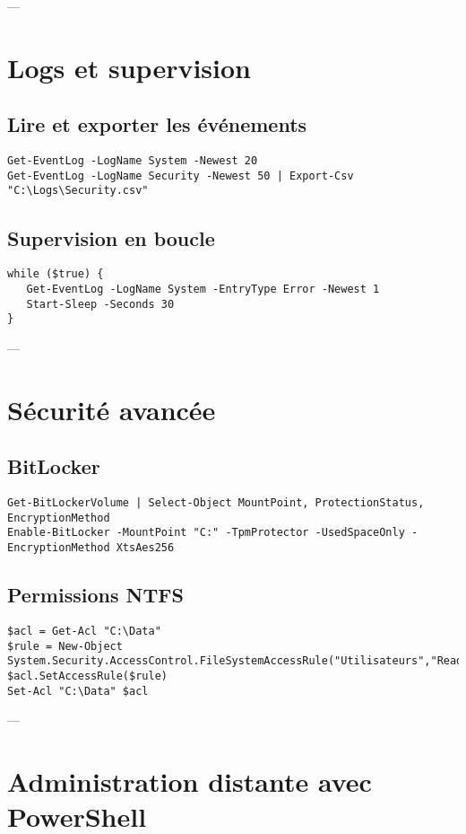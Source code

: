 \documentclass[a4paper,12pt]{article}
\begin{document}
---

\section{Logs et supervision}
\subsection{Lire et exporter les événements}
\begin{verbatim}
Get-EventLog -LogName System -Newest 20
Get-EventLog -LogName Security -Newest 50 | Export-Csv "C:\Logs\Security.csv"
\end{verbatim}

\subsection{Supervision en boucle}
\begin{verbatim}
while ($true) {
   Get-EventLog -LogName System -EntryType Error -Newest 1
   Start-Sleep -Seconds 30
}
\end{verbatim}

---

\section{Sécurité avancée}
\subsection{BitLocker}
\begin{verbatim}
Get-BitLockerVolume | Select-Object MountPoint, ProtectionStatus, EncryptionMethod
Enable-BitLocker -MountPoint "C:" -TpmProtector -UsedSpaceOnly -EncryptionMethod XtsAes256
\end{verbatim}

\subsection{Permissions NTFS}
\begin{verbatim}
$acl = Get-Acl "C:\Data"
$rule = New-Object System.Security.AccessControl.FileSystemAccessRule("Utilisateurs","ReadAndExecute","Allow")
$acl.SetAccessRule($rule)
Set-Acl "C:\Data" $acl
\end{verbatim}

---

\section{Administration distante avec PowerShell}
\end{document}
